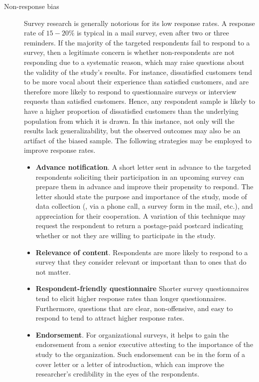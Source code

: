 \begin{description}
	\item[Non-response bias]\label{08:nonresponse} Survey research is generally notorious for its low response rates. A response rate of $ 15-20\% $ is typical in a mail survey, even after two or three reminders. If the majority of the targeted respondents fail to respond to a survey, then a legitimate concern is whether non-respondents are not responding due to a systematic reason, which may raise questions about the validity of the study's results. For instance, dissatisfied customers tend to be more vocal about their experience than satisfied customers, and are therefore more likely to respond to questionnaire surveys or interview requests than satisfied customers. Hence, any respondent sample is likely to have a higher proportion of dissatisfied customers than the underlying population from which it is drawn. In this instance, not only will the results lack generalizability, but the observed outcomes may also be an artifact of the biased sample. The following strategies may be employed to improve response rates.

\begin{itemize}
	\item \textbf{Advance notification}. A short letter sent in advance to the targeted respondents soliciting their participation in an upcoming survey can prepare them in advance and improve their propensity to respond. The letter should state the purpose and importance of the study, mode of data collection (\eg, via a phone call, a survey form in the mail, etc.), and appreciation for their cooperation. A variation of this technique may request the respondent to return a postage-paid postcard indicating whether or not they are willing to participate in the study.

	\item \textbf{Relevance of content}. Respondents are more likely to respond to a survey that they consider relevant or important than to ones that do not matter.

	\item \textbf{Respondent-friendly questionnaire} Shorter survey questionnaires tend to elicit higher response rates than longer questionnaires. Furthermore, questions that are clear, non-offensive, and easy to respond to tend to attract higher response rates.

	\item \textbf{Endorsement}. For organizational surveys, it helps to gain the endorsement from a senior executive attesting to the importance of the study to the organization. Such endorsement can be in the form of a cover letter or a letter of introduction, which can improve the researcher's credibility in the eyes of the respondents.


\end{itemize}
\end{description}
